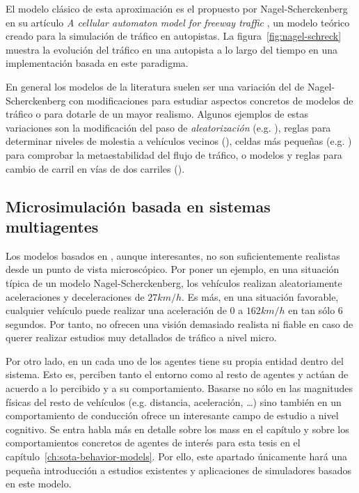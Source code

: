 El modelo clásico de esta aproximación es el propuesto por Nagel-Scherckenberg en su artículo \textit{A cellular automaton model for freeway traffic} \cite{Nagel1992}, un modelo teórico creado para la simulación de tráfico en autopistas. La figura~\ref{fig:nagel-schreck} muestra la evolución del tráfico en una autopista a lo largo del tiempo en una implementación basada en este paradigma.

En general los modelos de la literatura suelen ser una variación del de Nagel-Scherckenberg con modificaciones para estudiar aspectos concretos de modelos de tráfico o para dotarle de un mayor realismo. Algunos ejemplos de estas variaciones son la modificación del paso de \textit{aleatorización} (e.g. \cite{Barlovic1998}), reglas para determinar niveles de molestia a vehículos vecinos (\cite{Wagner1997}), celdas más pequeñas (e.g. \cite{Krauss1997}) para comprobar la metaestabilidad del flujo de tráfico, o modelos y reglas para cambio de carril en vías de dos carriles (\cite{Brilon1999, Nagel1998}).

\subsection{Microsimulación basada en sistemas multiagentes}

Los modelos basados en , aunque interesantes, no son suficientemente realistas desde un punto de vista microscópico. Por poner un ejemplo, en una situación típica de un modelo Nagel-Scherckenberg, los vehículos realizan aleatoriamente aceleraciones y deceleraciones de $27 km/h$. Es más, en una situación favorable, cualquier vehículo puede realizar una aceleración de $0$ a $162km/h$ en tan sólo $6$ segundos. Por tanto, no ofrecen una visión demasiado realista ni fiable en caso de querer realizar estudios muy detallados de tráfico a nivel micro.

Por otro lado, en un  cada uno de los agentes tiene su propia entidad dentro del sistema. Esto es, perciben tanto el entorno como al resto de agentes y actúan de acuerdo a lo percibido y a su comportamiento. Basarse no sólo en las magnitudes físicas del resto de vehículos (e.g. distancia, aceleración, \ldots) sino también en un comportamiento de conducción ofrece un interesante campo de estudio a nivel cognitivo. Se entra habla más en detalle sobre los \glspl{mas} en el capítulo  y sobre los comportamientos concretos de agentes de interés para esta tesis en el capítulo~\ref{ch:sota-behavior-models}. Por ello, este apartado únicamente hará una pequeña introducción a estudios existentes y aplicaciones de simuladores basados en este modelo.


